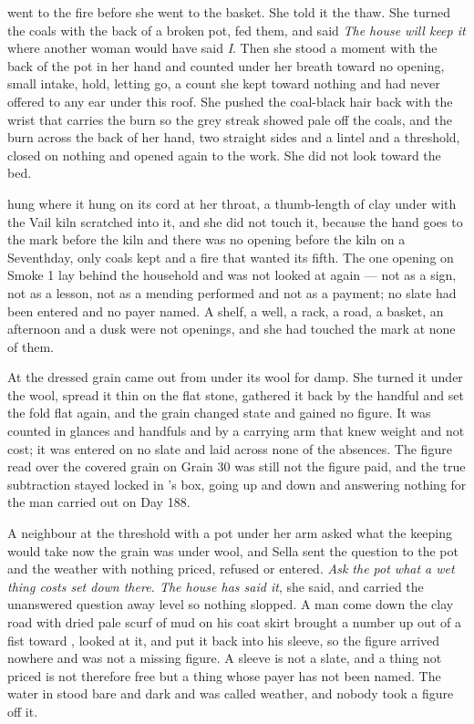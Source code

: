 \scenebreak

 went to the fire before she went to the basket. She told it the thaw. She turned the coals with the back of a broken pot, fed them, and said \emph{The house will keep it} where another woman would have said \emph{I}. Then she stood a moment with the back of the pot in her hand and counted under her breath toward no opening, small intake, hold, letting go, a count she kept toward nothing and had never offered to any ear under this roof. She pushed the coal-black hair back with the wrist that carries the burn so the grey streak showed pale off the coals, and the burn across the back of her hand, two straight sides and a lintel and a threshold, closed on nothing and opened again to the work. She did not look toward the bed.

 hung where it hung on its cord at her throat, a thumb-length of clay under  with the Vail kiln scratched into it, and she did not touch it, because the hand goes to the mark before the kiln and there was no opening before the kiln on a Seventhday, only coals kept and a fire that wanted its fifth. The one opening on Smoke 1 lay behind the household and was not looked at again --- not as a sign, not as a lesson, not as a mending performed and not as a payment; no slate had been entered and no payer named. A shelf, a well, a rack, a road, a basket, an afternoon and a dusk were not openings, and she had touched the mark at none of them.

At  the dressed grain came out from under its wool for damp. She turned it under the wool, spread it thin on the flat stone, gathered it back by the handful and set the fold flat again, and the grain changed state and gained no figure. It was counted in glances and handfuls and by a carrying arm that knew weight and not cost; it was entered on no slate and laid across none of the absences. The figure read over the covered grain on Grain 30 was still not the figure paid, and the true subtraction stayed locked in 's box, going up and down  and answering nothing for the man carried out on Day 188.

A neighbour at the threshold with a pot under her arm asked what the keeping would take now the grain was under wool, and Sella sent the question to the pot and the weather with nothing priced, refused or entered. \emph{Ask the pot what a wet thing costs set down there. The house has said it}, she said, and carried the unanswered question away level so nothing slopped. A man come down the clay road with dried pale scurf of mud on his coat skirt brought a number up out of a fist toward , looked at it, and put it back into his sleeve, so the figure arrived nowhere and was not a missing figure. A sleeve is not a slate, and a thing not priced is not therefore free but a thing whose payer has not been named. The water in  stood bare and dark and was called weather, and nobody took a figure off it.

